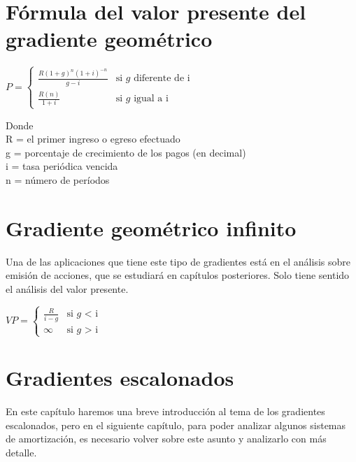 \section{Fórmula del valor presente del gradiente geométrico}
\begin{center}
	\fontsize{13}{13}\selectfont
	$P = \left \{ \begin{matrix}\frac{R(1+g)^{n}(1+i)^{-n}}{g-i} & \mbox{si }g\mbox{ diferente de i} 
			\\ \frac{R(n)}{1+i} & \mbox{si }g\mbox{ igual a i}\end{matrix}\right.$
\end{center}
Donde\\
R = el primer ingreso o egreso efectuado\\
g = porcentaje de crecimiento de los pagos (en decimal)\\
i = tasa periódica vencida\\
n = número de períodos\\







\section{Gradiente geométrico infinito}
Una de las aplicaciones que tiene este tipo de gradientes está en el análisis sobre emisión de acciones, que se estudiará en capítulos posteriores. Solo tiene sentido el análisis del valor presente.\\

\begin{center}
	\fontsize{13}{13}\selectfont
	$VP = \left \{ \begin{matrix}\frac{R}{i-g} & \mbox{si }g\mbox{ <  i} 
			\\ \infty & \mbox{si }g\mbox{ >  i}\end{matrix}\right.$
\end{center}



\section{Gradientes escalonados}
En este capítulo haremos una breve introducción al tema de los gradientes escalonados, pero en el siguiente capítulo, para poder analizar algunos sistemas de amortización, es necesario volver sobre este asunto y analizarlo con más detalle.\\

